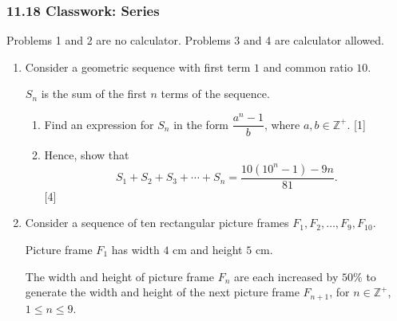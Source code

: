 \documentclass[12pt, twoside]{article}
\begin{document}
\subsubsection*{11.18 Classwork: Series}

Problems 1 and 2 are no calculator. Problems 3 and 4 are calculator allowed.

\begin{enumerate}[itemsep=0.35cm]

\item[1.] 

Consider a geometric sequence with first term $1$ and common ratio $10$.

$S_n$ is the sum of the first $n$ terms of the sequence.

\begin{enumerate}[itemsep=0.18cm]
  \item Find an expression for $S_n$ in the form
  $\dfrac{a^n-1}{b}$, where $a,b\in\mathbb{Z}^+$. \hfill [1]
  \item Hence, show that
  \[
    S_1+S_2+S_3+\cdots+S_n
    =\frac{10(10^n-1)-9n}{81}.
  \]
  \hfill [4]
\end{enumerate}


\newpage

\item[2.] 

Consider a sequence of ten rectangular picture frames
$F_1,F_2,\ldots,F_9,F_{10}$.

Picture frame $F_1$ has width $4\text{ cm}$ and height $5\text{ cm}$.

The width and height of picture frame $F_n$ are each increased by $50\%$
to generate the width and height of the next picture frame $F_{n+1}$, for
$n\in\mathbb{Z}^+$, $1\leq n\leq 9$.


\end{enumerate}
\end{document}
